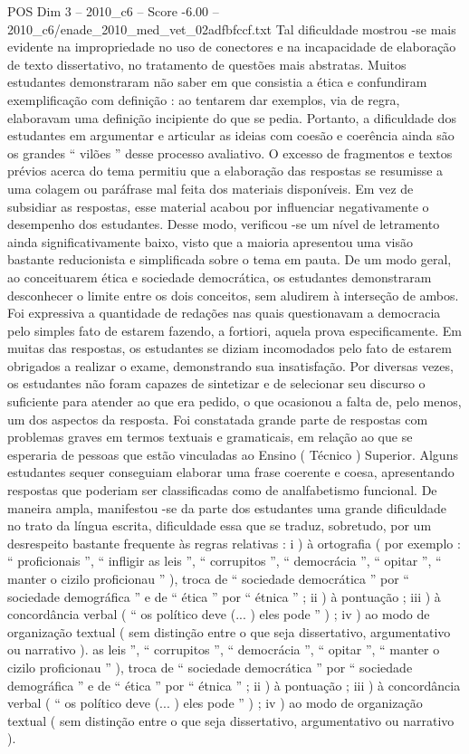 \begin{textsample}{POS Dim 3 – 2010\_c6 – Score -6.00 – 2010\_c6/enade\_2010\_med\_vet\_02adfbfccf.txt}
Tal dificuldade mostrou -se mais evidente na impropriedade no uso de conectores e na incapacidade de elaboração de texto dissertativo, no tratamento de questões mais abstratas.
Muitos estudantes demonstraram não saber em que consistia a ética e confundiram exemplificação com definição : ao tentarem dar exemplos, via de regra, elaboravam uma definição incipiente do que se pedia.
Portanto, a dificuldade dos estudantes em argumentar e articular as ideias com coesão e coerência ainda são os grandes “ vilões ” desse processo avaliativo.
O excesso de fragmentos e textos prévios acerca do tema permitiu que a elaboração das respostas se resumisse a uma colagem ou paráfrase mal feita dos materiais disponíveis.
Em vez de subsidiar as respostas, esse material acabou por influenciar negativamente o desempenho dos estudantes.
Desse modo, verificou -se um nível de letramento ainda significativamente baixo, visto que a maioria apresentou uma visão bastante reducionista e simplificada sobre o tema em pauta.
De um modo geral, ao conceituarem ética e sociedade democrática, os estudantes demonstraram desconhecer o limite entre os dois conceitos, sem aludirem à interseção de ambos.
Foi expressiva a quantidade de redações nas quais questionavam a democracia pelo simples fato de estarem fazendo, a fortiori, aquela prova especificamente.
Em muitas das respostas, os estudantes se diziam incomodados pelo fato de estarem obrigados a realizar o exame, demonstrando sua insatisfação.
Por diversas vezes, os estudantes não foram capazes de sintetizar e de selecionar seu discurso o suficiente para atender ao que era pedido, o que ocasionou a falta de, pelo menos, um dos aspectos da resposta.
Foi constatada grande parte de respostas com problemas graves em termos textuais e gramaticais, em relação ao que se esperaria de pessoas que estão vinculadas ao Ensino ( Técnico ) Superior.
Alguns estudantes sequer conseguiam elaborar uma frase coerente e coesa, apresentando respostas que poderiam ser classificadas como de analfabetismo funcional.
De maneira ampla, manifestou -se da parte dos estudantes uma grande dificuldade no trato da língua escrita, dificuldade essa que se traduz, sobretudo, por um desrespeito bastante frequente às regras relativas : i ) à ortografia ( por exemplo : “ proficionais ”, “ infligir as leis ”, “ corrupitos ”, “ democrácia ”, “ opitar ”, “ manter o cizilo proficionau ” ), troca de “ sociedade democrática ” por “ sociedade demográfica ” e de “ ética ” por “ étnica ” ; ii ) à pontuação ; iii ) à concordância verbal ( “ os político deve (... ) eles pode ” ) ; iv ) ao modo de organização textual ( sem distinção entre o que seja dissertativo, argumentativo ou narrativo ). as leis ”, “ corrupitos ”, “ democrácia ”, “ opitar ”, “ manter o cizilo proficionau ” ), troca de “ sociedade democrática ” por “ sociedade demográfica ” e de “ ética ” por “ étnica ” ; ii ) à pontuação ; iii ) à concordância verbal ( “ os político deve (... ) eles pode ” ) ; iv ) ao modo de organização textual ( sem distinção entre o que seja dissertativo, argumentativo ou narrativo ).

\end{textsample}
